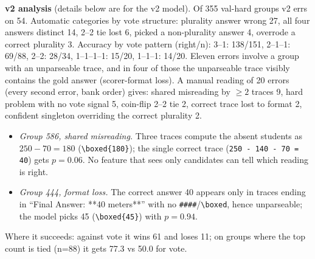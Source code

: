 \documentclass[10pt,a4paper]{article}
\begin{document}
\textbf{v2 analysis} (details below are for the v2 model). Of 355 val-hard groups v2 errs on 54. Automatic categories by vote structure: plurality answer wrong 27, all four answers distinct 14, 2--2 tie lost 6, picked a non-plurality answer 4, overrode a correct plurality 3. Accuracy by vote pattern (right/n): 3--1: 138/151, 2--1--1: 69/88, 2--2: 28/34, 1--1--1--1: 15/20, 1--1--1: 14/20. Eleven errors involve a group with an unparseable trace, and in four of those the unparseable trace visibly contains the gold answer (scorer-format loss). A manual reading of 20 errors (every second error, bank order) gives: shared misreading by $\ge2$ traces 9, hard problem with no vote signal 5, coin-flip 2--2 tie 2, correct trace lost to format 2, confident singleton overriding the correct plurality 2.
\begin{itemize}
\item \emph{Group 586, shared misreading.} Three traces compute the absent students as $250-70=180$ (\verb|\boxed{180}|); the single correct trace (\verb|250 - 140 - 70 = 40|) gets $p=0.06$. No feature that sees only candidates can tell which reading is right.
\item \emph{Group 444, format loss.} The correct answer 40 appears only in traces ending in ``Final Answer: **40 meters**'' with no \verb|####|/\verb|\boxed|, hence unparseable; the model picks 45 (\verb|\boxed{45}|) with $p=0.94$.
\end{itemize}
Where it succeeds: against vote it wins 61 and loses 11; on groups where the top count is tied (n=88) it gets 77.3 vs 50.0 for vote.
\end{document}

